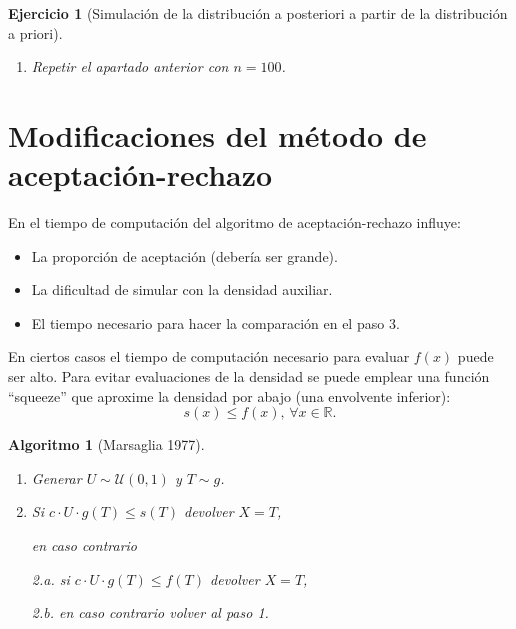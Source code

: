 \documentclass[
]{book}
\theoremstyle{break}
\newtheorem{conjecture}{Algoritmo}[chapter]
\newtheorem{exercise}{Ejercicio}[chapter]
\theoremstyle{nonumberplain}
\begin{document}
\begin{exercise}[Simulación de la distribución a posteriori a partir de la distribución a priori]
\begin{enumerate}
  \begin{figure}[!htb]

  {\centering \texttt{[image: 04-Metodos\_generales\_continuas\_files/figure-latex/ic-bayes-1]} 

  }

  \caption{Distribución de los valores generados y aproximación del intervalo de credibilidad.}\label{fig:ic-bayes}
  \end{figure}
\item
  Repetir el apartado anterior con \(n=100\).
\end{enumerate}

\end{exercise}

\hypertarget{modAR}{%
\section{Modificaciones del método de aceptación-rechazo}\label{modAR}}

En el tiempo de computación del algoritmo de aceptación-rechazo influye:

\begin{itemize}
\item
  La proporción de aceptación (debería ser grande).
\item
  La dificultad de simular con la densidad auxiliar.
\item
  El tiempo necesario para hacer la comparación en el paso 3.
\end{itemize}

En ciertos casos el tiempo de computación necesario para evaluar \(f(x)\) puede ser alto.
Para evitar evaluaciones de la densidad se puede emplear una función ``squeeze'' que aproxime la densidad por abajo (una envolvente inferior):
\[s(x)\leq f(x) \text{, }\forall x\in \mathbb{R}.\]

\begin{conjecture}[Marsaglia 1977]
\protect\hypertarget{cnj:marsaglia}{}\label{cnj:marsaglia}

\begin{enumerate}
\def\labelenumi{\arabic{enumi}.}
\item
  Generar \(U \sim \mathcal{U}(0, 1)\) y \(T\sim g\).
\item
  Si \(c\cdot U\cdot g\left( T\right) \leq s\left( T\right)\) devolver \(X=T\),

  en caso contrario

  2.a. si \(c\cdot U\cdot g\left( T\right) \leq f\left( T\right)\)
  devolver \(X=T\),

  2.b. en caso contrario volver al paso 1.
\end{enumerate}

\end{conjecture}
\end{document}
